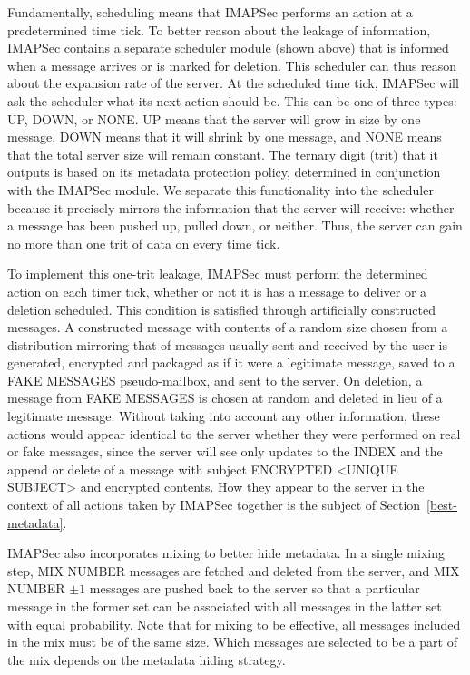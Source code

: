 \documentclass[pageno]{jpaper}
\newcommand{\project}{IMAPSec }
\begin{document}
Fundamentally, scheduling means that \project performs an action at a predetermined time tick. To better reason about the leakage of information, \project contains a separate scheduler module (shown above) that is informed when a message arrives or is marked for deletion. This scheduler can thus reason about the expansion rate of the server. At the scheduled time tick, \project will ask the scheduler what its next action should be. This can be one of three types: UP, DOWN, or NONE. UP means that the server will grow in size by one message, DOWN means that it will shrink by one message, and NONE means that the total server size will remain constant. The ternary digit (trit) that it outputs is based on its metadata protection policy, determined in conjunction with the \project module. We separate this functionality into the scheduler because it precisely mirrors the information that the server will receive: whether a message has been pushed up, pulled down, or neither. Thus, the server can gain no more than one trit of data on every time tick.

To implement this one-trit leakage, \project must perform the determined action on each timer tick, whether or not it is has a message to deliver or a deletion scheduled. This condition is satisfied through artificially constructed messages. A constructed message with contents of a random size chosen from a distribution mirroring that of messages usually sent and received by the user is generated, encrypted and packaged as if it were a legitimate message, saved to a FAKE MESSAGES pseudo-mailbox, and sent to the server. On deletion, a message from FAKE MESSAGES is chosen at random and deleted in lieu of a legitimate message. Without taking into account any other information, these actions would appear identical to the server whether they were performed on real or fake messages, since the server will see only updates to the INDEX and the append or delete of a message with subject ENCRYPTED <UNIQUE SUBJECT> and encrypted contents. How they appear to the server in the context of all actions taken by \project together is the subject of Section~\ref{best-metadata}.

\project also incorporates mixing to better hide metadata. In a single mixing step, MIX NUMBER messages are fetched and deleted from the server, and MIX NUMBER $\pm 1$ messages are pushed back to the server so that a particular message in the former set can be associated with all messages in the latter set with equal probability. Note that for mixing to be effective, all messages included in the mix must be of the same size. Which messages are selected to be a part of the mix depends on the metadata hiding strategy.
\end{document}
